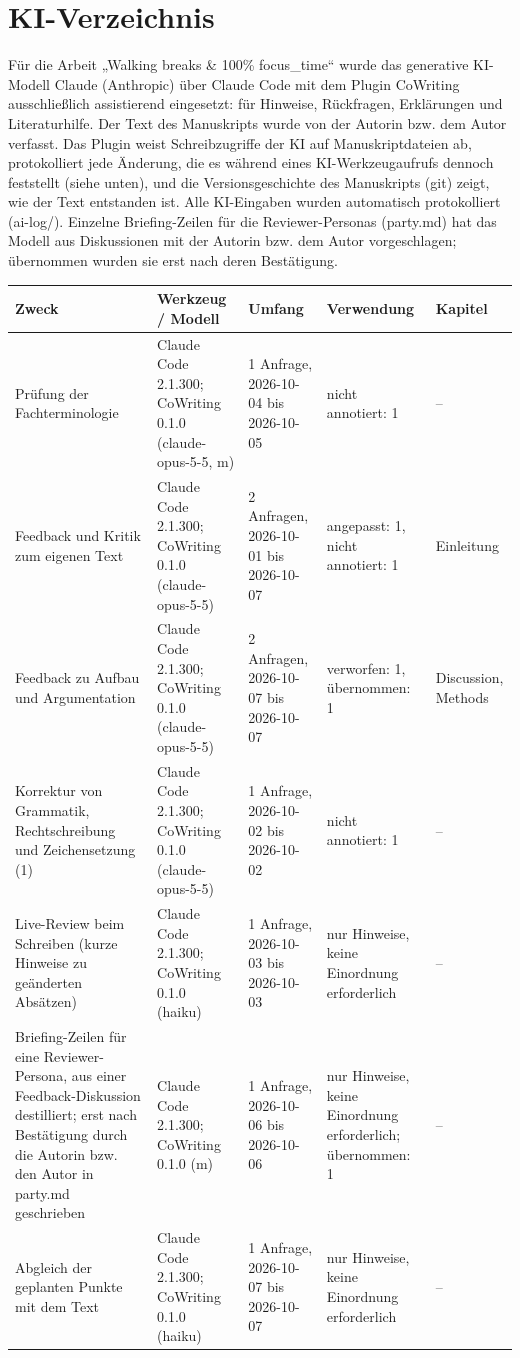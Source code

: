 \section*{KI-Verzeichnis}

Für die Arbeit „Walking breaks \& 100\% focus\_time“ wurde das generative KI-Modell Claude (Anthropic) über Claude Code mit dem Plugin CoWriting ausschließlich assistierend eingesetzt: für Hinweise, Rückfragen, Erklärungen und Literaturhilfe. Der Text des Manuskripts wurde von der Autorin bzw. dem Autor verfasst. Das Plugin weist Schreibzugriffe der KI auf Manuskriptdateien ab, protokolliert jede Änderung, die es während eines KI-Werkzeugaufrufs dennoch feststellt (siehe unten), und die Versionsgeschichte des Manuskripts (git) zeigt, wie der Text entstanden ist. Alle KI-Eingaben wurden automatisch protokolliert (ai-log/). Einzelne Briefing-Zeilen für die Reviewer-Personas (party.md) hat das Modell aus Diskussionen mit der Autorin bzw. dem Autor vorgeschlagen; übernommen wurden sie erst nach deren Bestätigung.

\begin{tabular}{p{.22\linewidth}p{.18\linewidth}p{.2\linewidth}p{.2\linewidth}p{.1\linewidth}}
\hline
\textbf{Zweck} & \textbf{Werkzeug / Modell} & \textbf{Umfang} & \textbf{Verwendung} & \textbf{Kapitel} \\
\hline
Prüfung der Fachterminologie & Claude Code 2.1.300; CoWriting 0.1.0 (claude-opus-5-5, m) & 1 Anfrage, 2026-10-04 bis 2026-10-05 & nicht annotiert: 1 & – \\
Feedback und Kritik zum eigenen Text & Claude Code 2.1.300; CoWriting 0.1.0 (claude-opus-5-5) & 2 Anfragen, 2026-10-01 bis 2026-10-07 & angepasst: 1, nicht annotiert: 1 & Einleitung \\
Feedback zu Aufbau und Argumentation & Claude Code 2.1.300; CoWriting 0.1.0 (claude-opus-5-5) & 2 Anfragen, 2026-10-07 bis 2026-10-07 & verworfen: 1, übernommen: 1 & Discussion, Methods \\
Korrektur von Grammatik, Rechtschreibung und Zeichensetzung (1) & Claude Code 2.1.300; CoWriting 0.1.0 (claude-opus-5-5) & 1 Anfrage, 2026-10-02 bis 2026-10-02 & nicht annotiert: 1 & – \\
Live-Review beim Schreiben (kurze Hinweise zu geänderten Absätzen) & Claude Code 2.1.300; CoWriting 0.1.0 (haiku) & 1 Anfrage, 2026-10-03 bis 2026-10-03 & nur Hinweise, keine Einordnung erforderlich & – \\
Briefing-Zeilen für eine Reviewer-Persona, aus einer Feedback-Diskussion destilliert; erst nach Bestätigung durch die Autorin bzw. den Autor in party.md geschrieben & Claude Code 2.1.300; CoWriting 0.1.0 (m) & 1 Anfrage, 2026-10-06 bis 2026-10-06 & nur Hinweise, keine Einordnung erforderlich; übernommen: 1 & – \\
Abgleich der geplanten Punkte mit dem Text & Claude Code 2.1.300; CoWriting 0.1.0 (haiku) & 1 Anfrage, 2026-10-07 bis 2026-10-07 & nur Hinweise, keine Einordnung erforderlich & – \\
\hline
\end{tabular}

